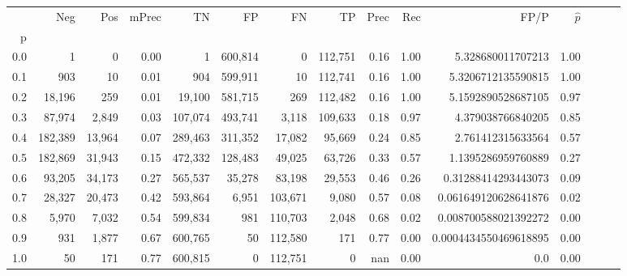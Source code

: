 \begin{tabular}{rrrrrrrrrrrrrrr}
\toprule
{} &      Neg &     Pos & mPrec &       TN &       FP &       FN &       TP &  Prec &   Rec &                   FP/P & $\hat{p}$ \\
p   &          &         &       &          &          &          &          &       &       &                        &           \\
\midrule
0.0 &        1 &       0 &  0.00 &        1 &  600,814 &        0 &  112,751 &  0.16 &  1.00 &      5.328680011707213 &      1.00 \\
0.1 &      903 &      10 &  0.01 &      904 &  599,911 &       10 &  112,741 &  0.16 &  1.00 &     5.3206712135590815 &      1.00 \\
0.2 &   18,196 &     259 &  0.01 &   19,100 &  581,715 &      269 &  112,482 &  0.16 &  1.00 &     5.1592890528687105 &      0.97 \\
0.3 &   87,974 &   2,849 &  0.03 &  107,074 &  493,741 &    3,118 &  109,633 &  0.18 &  0.97 &      4.379038766840205 &      0.85 \\
0.4 &  182,389 &  13,964 &  0.07 &  289,463 &  311,352 &   17,082 &   95,669 &  0.24 &  0.85 &      2.761412315633564 &      0.57 \\
0.5 &  182,869 &  31,943 &  0.15 &  472,332 &  128,483 &   49,025 &   63,726 &  0.33 &  0.57 &     1.1395286959760889 &      0.27 \\
0.6 &   93,205 &  34,173 &  0.27 &  565,537 &   35,278 &   83,198 &   29,553 &  0.46 &  0.26 &    0.31288414293443073 &      0.09 \\
0.7 &   28,327 &  20,473 &  0.42 &  593,864 &    6,951 &  103,671 &    9,080 &  0.57 &  0.08 &   0.061649120628641876 &      0.02 \\
0.8 &    5,970 &   7,032 &  0.54 &  599,834 &      981 &  110,703 &    2,048 &  0.68 &  0.02 &   0.008700588021392272 &      0.00 \\
0.9 &      931 &   1,877 &  0.67 &  600,765 &       50 &  112,580 &      171 &  0.77 &  0.00 &  0.0004434550469618895 &      0.00 \\
1.0 &       50 &     171 &  0.77 &  600,815 &        0 &  112,751 &        0 &   nan &  0.00 &                    0.0 &      0.00 \\
\bottomrule
\end{tabular}
